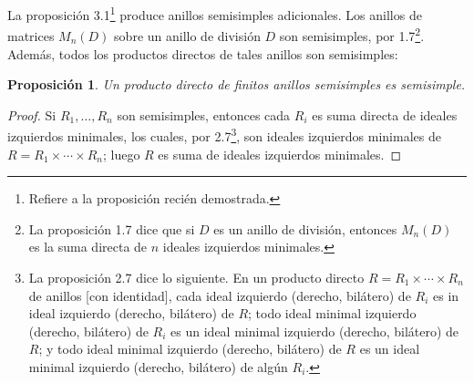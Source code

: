 \documentclass{article}
\newtheorem{proposition}{Proposición}[section]
\begin{document}
La proposición 3.1\footnote{Refiere a la proposición recién demostrada.} produce anillos semisimples adicionales. Los anillos de matrices $M_n(D)$ sobre un anillo de división $D$ son semisimples, por 1.7\footnote{La proposición 1.7 dice que si $D$ es un anillo de división, entonces $M_n(D)$ es la suma directa de $n$ ideales izquierdos minimales.}. Además, todos los productos directos de tales anillos son semisimples:

\begin{proposition}
    Un producto directo de finitos anillos semisimples es semisimple.
\end{proposition}

\begin{proof}
    Si $R_1, \ldots, R_n$ son semisimples, entonces cada $R_i$ es suma directa de ideales izquierdos minimales, los cuales, por 2.7\footnote{La proposición 2.7 dice lo siguiente. En un producto directo $R = R_1 \times \cdots \times R_n$ de anillos [con identidad], cada ideal izquierdo (derecho, bilátero) de $R_i$ es in ideal izquierdo (derecho, bilátero) de $R$; todo ideal minimal izquierdo (derecho, bilátero) de $R_i$ es un ideal minimal izquierdo (derecho, bilátero) de $R$; y todo ideal minimal izquierdo (derecho, bilátero) de $R$ es un ideal minimal izquierdo (derecho, bilátero) de algún $R_i$.}, son ideales izquierdos minimales de $R = R_1 \times \cdots \times R_n$; luego $R$ es suma de ideales izquierdos minimales.
\end{proof}
\end{document}
